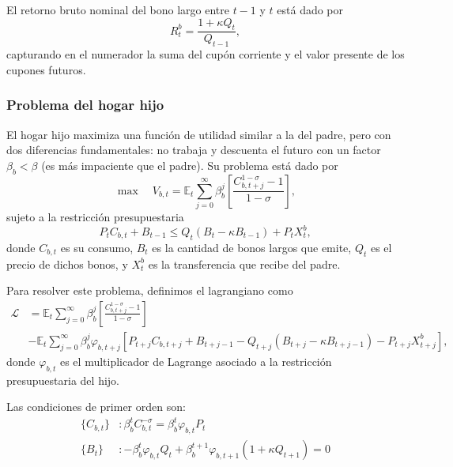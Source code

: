 \documentclass[../../entrega.tex]{subfiles}
\begin{document}
El retorno bruto nominal del bono largo entre $t-1$ y $t$ está dado por
\begin{equation}
    R_t^b = \frac{1 + \kappa Q_t}{Q_{t-1}},
\end{equation}
capturando en el numerador la suma del cupón corriente y el valor presente de los cupones futuros.

\subsubsection{Problema del hogar hijo}
El hogar hijo maximiza una función de utilidad similar a la del padre, pero con dos diferencias fundamentales: no trabaja y descuenta el futuro con un factor $\beta_b < \beta$ (es más impaciente que el padre).
Su problema está dado por
\begin{equation*}
    \max \quad V_{b,t} = \mathbb{E}_t \sum_{j=0}^{\infty} \beta_b^j \left[\frac{C_{b,t+j}^{1-\sigma}-1}{1-\sigma}\right],
\end{equation*}
sujeto a la restricción presupuestaria
\begin{equation*}
    P_t C_{b,t} + B_{t-1} \leq Q_t(B_t - \kappa B_{t-1}) + P_t X_t^b,
\end{equation*}
donde $C_{b,t}$ es su consumo, $B_t$ es la cantidad de bonos largos que emite, $Q_t$ es el precio de dichos bonos, y $X_t^b$ es la transferencia que recibe del padre.

Para resolver este problema, definimos el lagrangiano como
\begin{align*}
    \mathcal{L} & = \mathbb{E}_t \sum_{j=0}^{\infty} \beta_b^j \left[\frac{C_{b,t+j}^{1-\sigma}-1}{1-\sigma}\right]                                                                  \\
                & - \mathbb{E}_t \sum_{j=0}^{\infty} \beta_b^j \varphi_{b,t+j} \left[P_{t+j} C_{b,t+j} + B_{t+j-1} - Q_{t+j}(B_{t+j} - \kappa B_{t+j-1}) - P_{t+j} X_{t+j}^b\right],
\end{align*}
donde $\varphi_{b,t}$ es el multiplicador de Lagrange asociado a la restricción presupuestaria del hijo.

Las condiciones de primer orden son:
\begin{align*}
    \{C_{b,t}\} & : \beta_b^t C_{b,t}^{-\sigma} = \beta_b^t \varphi_{b,t} P_t                            \\
    \{B_t\}     & : -\beta_b^t \varphi_{b,t} Q_t + \beta_b^{t+1} \varphi_{b,t+1}(1 + \kappa Q_{t+1}) = 0
\end{align*}
\end{document}

